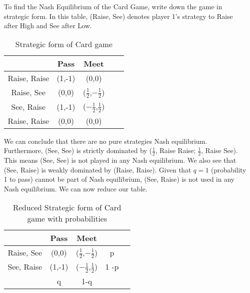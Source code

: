 \begin{illustration} To find the Nash Equilibrium of the Card Game, write down the game in strategic form. In this table, (Raise, See) denotes player 1’s strategy to Raise after High and See after Low.

    \begin{table}[h!]
        \begin{center}
            \begin{tabular}{ c | c c c c}
                             & Pass   & Meet                           & \\ \hline
                Raise, Raise & (1,-1) & (0,0)                            \\
                Raise, See   & (0,0)  & ($\frac{1}{2}$,$-\frac{1}{2}$)   \\
                See, Raise   & (1,-1) & ($-\frac{1}{2}$,$\frac{1}{2}$)   \\
                Raise, Raise & (0,0)  & (0,0)
            \end{tabular}
            \caption{Strategic form of Card game}
        \end{center}
    \end{table}
    We can conclude that there are no pure strategies Nash equilibrium. Furthermore, (See, See) is strictly dominated by ($\frac{1}{2}$, Raise Raise; $\frac{1}{2}$, Raise See). This means (See, See) is not played in any Nash equilibrium.
    We also see that (See, Raise) is weakly dominated by (Raise, Raise). Given that $q=1$ (probability 1 to pass) cannot be part of Nash equilibrium, (See, Raise) is not used in any Nash equilibrium. We can now reduce our table.

    \begin{table}[h!]
        \begin{center}
            \begin{tabular}{ c c c c c}
                           & Pass   & Meet                           &      \\ \hline
                Raise, See & (0,0)  & ($\frac{1}{2}$,$-\frac{1}{2}$) & p    \\
                See, Raise & (1,-1) & ($-\frac{1}{2}$,$\frac{1}{2}$) & 1 -p \\
                           & q      & 1-q
            \end{tabular}
            \caption{Reduced Strategic form of Card game with probabilities}
        \end{center}
    \end{table}


\end{illustration}
